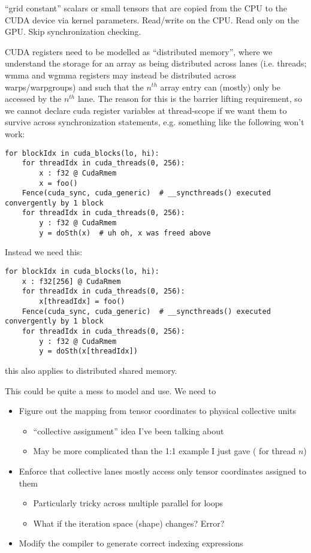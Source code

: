 \filbreak
{} ``grid constant'' scalars or small tensors that are copied from the CPU to the CUDA device via kernel parameters.
Read/write on the CPU. Read only on the GPU. Skip synchronization checking.

\filbreak
{} CUDA registers need to be modelled as ``distributed memory'', where we understand the storage for an array as being distributed across lanes (i.e. threads; wmma and wgmma registers may instead be distributed across warps/warpgroups) and such that the $n^{th}$ array entry can (mostly) only be accessed by the $n^{th}$ lane.
The reason for this is the barrier lifting requirement, so we cannot declare cuda register variables at thread-scope if we want them to survive across synchronization statements, e.g. something like the following won't work:

\filbreak
{\color{lightttColor}
\begin{verbatim}
for blockIdx in cuda_blocks(lo, hi):
    for threadIdx in cuda_threads(0, 256):
        x : f32 @ CudaRmem
        x = foo()
    Fence(cuda_sync, cuda_generic)  # __syncthreads() executed convergently by 1 block
    for threadIdx in cuda_threads(0, 256):
        y : f32 @ CudaRmem
        y = doSth(x)  # uh oh, x was freed above
\end{verbatim}
}

\filbreak
Instead we need this:
{\color{lightttColor}
\begin{verbatim}
for blockIdx in cuda_blocks(lo, hi):
    x : f32[256] @ CudaRmem
    for threadIdx in cuda_threads(0, 256):
        x[threadIdx] = foo()
    Fence(cuda_sync, cuda_generic)  # __syncthreads() executed convergently by 1 block
    for threadIdx in cuda_threads(0, 256):
        y : f32 @ CudaRmem
        y = doSth(x[threadIdx])
\end{verbatim}
}

 this also applies to distributed shared memory.

\filbreak
This could be quite a mess to model and use.
We need to
\begin{itemize}
  \item Figure out the mapping from tensor coordinates to physical collective units
  \begin{itemize}
    \item {} ``collective assignment'' idea I've been talking about
    \item May be more complicated than the 1:1 example I just gave (\lighttt{[n]} for thread $n$)
  \end{itemize}
  \item Enforce that collective lanes mostly access only tensor coordinates assigned to them
  \begin{itemize}
    \item Particularly tricky across multiple parallel for loops
    \item What if the iteration space (shape) changes? Error?
  \end{itemize}
  \item Modify the compiler to generate correct indexing expressions
\end{itemize}

